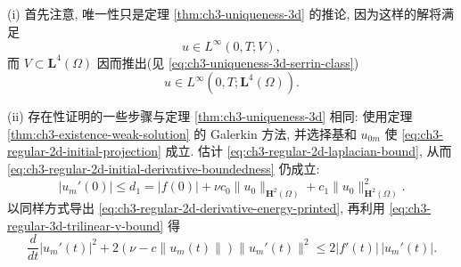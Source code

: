 \begin{Proof}
(i) 首先注意, 唯一性只是定理 \ref{thm:ch3-uniqueness-3d} 的推论, 因为这样的解将满足
\begin{equation}
u\in L^\infty(0,T;V),
\label{eq:ch3-regular-3d-v-linfty}
\end{equation}
而 $V\subset\mathbf L^4(\Omega)$ 因而推出(见 \eqref{eq:ch3-uniqueness-3d-serrin-class})
\begin{equation}
u\in L^\infty(0,T;\mathbf L^4(\Omega)).
\label{eq:ch3-regular-3d-l4-linfty}
\end{equation}

(ii) 存在性证明的一些步骤与定理 \ref{thm:ch3-uniqueness-3d} 相同: 使用定理 \ref{thm:ch3-existence-weak-solution} 的 Galerkin 方法, 并选择基和 $u_{0m}$ 使 \eqref{eq:ch3-regular-2d-initial-projection} 成立. 估计 \eqref{eq:ch3-regular-2d-laplacian-bound}, 从而 \eqref{eq:ch3-regular-2d-initial-derivative-boundedness} 仍成立:
\begin{equation}
|u_m'(0)|\leq d_1
=|f(0)|+\nu c_0\lVert u_0\rVert_{\mathbf H^2(\Omega)}
+c_1\lVert u_0\rVert_{\mathbf H^2(\Omega)}^2.
\label{eq:ch3-regular-3d-initial-derivative-bound}
\end{equation}
以同样方式导出 \eqref{eq:ch3-regular-2d-derivative-energy-printed}, 再利用 \eqref{eq:ch3-regular-3d-trilinear-v-bound} 得
\begin{equation}
\frac d{dt}|u_m'(t)|^2
+2(\nu-c\lVert u_m(t)\rVert)\lVert u_m'(t)\rVert^2
\leq2|f'(t)|\,|u_m'(t)|.
\label{eq:ch3-regular-3d-derivative-energy}
\end{equation}


\end{Proof}
